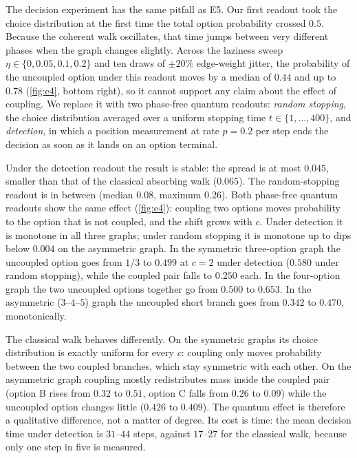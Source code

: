 The decision experiment has the same pitfall as E5. Our first readout took
the choice distribution at the first time the total option probability
crossed $0.5$. Because the coherent walk oscillates, that time jumps between
very different phases when the graph changes slightly. Across the laziness
sweep $\eta\in\{0,0.05,0.1,0.2\}$ and ten draws of $\pm20\%$ edge-weight jitter,
the probability of the uncoupled option under this readout moves by a median
of $0.44$ and up to $0.78$ (\cref{fig:e4}, bottom right), so it cannot support
any claim about the effect of coupling. We replace it
with two phase-free quantum readouts: \emph{random stopping}, the choice
distribution averaged over a uniform stopping time $t\in\{1,\dots,400\}$, and
\emph{detection}, in which a position measurement at rate $p=0.2$ per step
ends the decision as soon as it lands on an option terminal.

Under the detection readout the result is stable: the spread is at most
$0.045$, smaller than that of the classical absorbing walk ($0.065$). The
random-stopping readout is in between (median $0.08$, maximum $0.26$).
Both phase-free quantum readouts show the same effect (\cref{fig:e4}): coupling
two options moves probability to the option that is not coupled, and the
shift grows with $c$. Under detection it is monotone in all three graphs;
under random stopping it is monotone up to dips below $0.004$ on the
asymmetric graph. In the symmetric three-option graph the
uncoupled option goes from $1/3$ to $0.499$ at $c=2$ under detection ($0.580$
under random stopping), while the coupled pair falls to $0.250$ each. In the
four-option graph the two uncoupled options together go from $0.500$ to
$0.653$. In the asymmetric ($3$--$4$--$5$) graph the uncoupled short branch
goes from $0.342$ to $0.470$, monotonically.

The classical walk behaves differently. On the symmetric graphs its choice
distribution is exactly uniform for every $c$: coupling only moves probability
between the two coupled branches, which stay symmetric with each other. On the
asymmetric graph coupling mostly redistributes mass inside the coupled pair
(option B rises from $0.32$ to $0.51$, option C falls from $0.26$ to $0.09$) while the uncoupled
option changes little ($0.426$ to $0.409$). The quantum effect is therefore a
qualitative difference, not a matter of degree. Its cost is time: the mean
decision time under detection is $31$--$44$ steps, against $17$--$27$ for the
classical walk, because only one step in five is measured.

